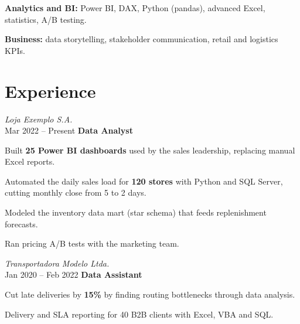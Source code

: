         \vspace{0.12 cm}

        \begin{onecolentry}
            \textbf{Analytics and BI:} Power BI, DAX, Python (pandas), advanced Excel, statistics, A/B testing.
        \end{onecolentry}

        \vspace{0.12 cm}

        \begin{onecolentry}
            \textbf{Business:} data storytelling, stakeholder communication, retail and logistics KPIs.
        \end{onecolentry}

    \section{Experience}
        \begin{twocolentry}{
            \textit{Loja Exemplo S.A.} \\
            Mar 2022 -- Present
        }
            \textbf{Data Analyst}
        \end{twocolentry}
        \vspace{0.10cm}
        \begin{onecolentry}
            \begin{highlights}
                \item Built \textbf{25 Power BI dashboards} used by the sales leadership, replacing manual Excel reports.
                \item Automated the daily sales load for \textbf{120 stores} with Python and SQL Server, cutting monthly close from 5 to 2 days.
                \item Modeled the inventory data mart (star schema) that feeds replenishment forecasts.
                \item Ran pricing A/B tests with the marketing team.
            \end{highlights}
        \end{onecolentry}
        \vspace{0.2cm}

        \begin{twocolentry}{
            \textit{Transportadora Modelo Ltda.} \\
            Jan 2020 -- Feb 2022
        }
            \textbf{Data Assistant}
        \end{twocolentry}
        \vspace{0.10cm}
        \begin{onecolentry}
            \begin{highlights}
                \item Cut late deliveries by \textbf{15\%} by finding routing bottlenecks through data analysis.
                \item Delivery and SLA reporting for 40 B2B clients with Excel, VBA and SQL.
            \end{highlights}
        \end{onecolentry}

